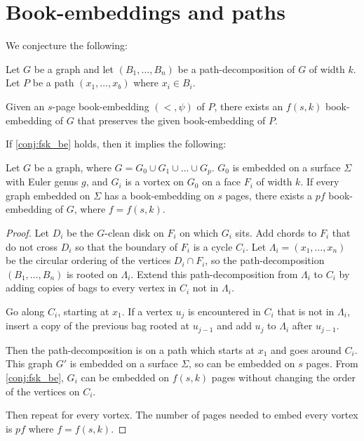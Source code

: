 \section{Book-embeddings and paths}

We conjecture the following:

\begin{conjecture}\label{conj:fsk_be}
	Let $G$ be a graph and let $(B_1, \ldots, B_n)$ be a path-decomposition of $G$ of width $k$. Let $P$ be a path $(x_1, \ldots, x_b)$ where $x_i \in B_i$. 

	Given an $s$-page book-embedding $(<, \psi)$ of $P$, there exists an $f(s, k)$ book-embedding of $G$ that preserves the given book-embedding of $P$.
\end{conjecture}

If \cref{conj:fsk_be} holds, then it implies the following:

\begin{corollary}\label{corr:fsk_be}
	Let $G$ be a graph, where $G = G_0 \cup G_1 \cup \ldots \cup G_p$. $G_0$ is embedded on a surface $\Sigma$ with Euler genus $g$, and $G_i$ is a vortex on $G_0$ on a face $F_i$ of width $k$. If every graph embedded on $\Sigma$ has a book-embedding on $s$ pages, there exists a $p f$ book-embedding of $G$, where $f = f(s, k)$.
\end{corollary}

\begin{proof}
	Let $D_i$ be the $G$-clean disk on $F_i$ on which $G_i$ sits. Add chords to $F_i$ that do not cross $D_i$ so that the boundary of $F_i$ is a cycle $C_i$. Let $\Lambda_i= (x_1, \ldots, x_n)$ be the circular ordering of the vertices $D_i \cap F_i$, so the path-decomposition $(B_1, \ldots , B_n)$ is rooted on $\Lambda_i$. Extend this path-decomposition from $\Lambda_i$ to $C_i$ by adding copies of bags to every vertex in $C_i$ not in $\Lambda_i$.

	Go along $C_i$, starting at $x_1$. If a vertex $u_j$ is encountered in $C_i$ that is not in $\Lambda_i$, insert a copy of the previous bag rooted at $u_{j-1}$ and add $u_j$ to $\Lambda_i$ after $u_{j-1}$.
	
	Then the path-decomposition is on a path which starts at $x_1$ and goes around $C_i$.  
	This graph $G'$ is embedded on a surface $\Sigma$, so can be embedded on $s$ pages. From \cref{conj:fsk_be}, $G_i$ can be embedded on $f(s, k)$ pages without changing the order of the vertices on $C_i$.

	Then repeat for every vortex. The number of pages needed to embed every vortex is $p f$ where $f = f(s, k)$. 
\end{proof}


